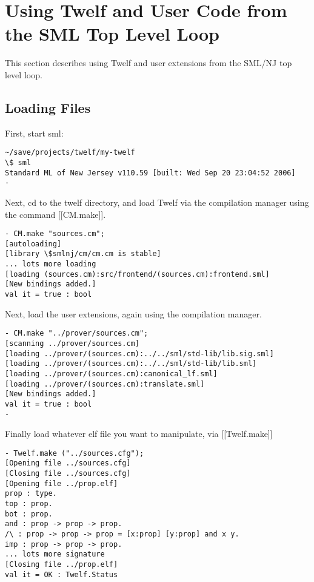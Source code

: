 \section{Using Twelf and User Code from the SML Top Level Loop}

This section describes using Twelf and user extensions from the SML/NJ top level
loop.


\subsection{Loading Files}
First, start sml:


\begin{verbatim} 
~/save/projects/twelf/my-twelf
\$ sml
Standard ML of New Jersey v110.59 [built: Wed Sep 20 23:04:52 2006]
- 
\end{verbatim} 

Next, cd to the twelf directory, and load Twelf via
the compilation manager using the command [[CM.make]].

\begin{verbatim} 
- CM.make "sources.cm"; 
[autoloading]
[library \$smlnj/cm/cm.cm is stable]
... lots more loading
[loading (sources.cm):src/frontend/(sources.cm):frontend.sml]
[New bindings added.]
val it = true : bool
\end{verbatim} 

Next, load the user extensions, again using
the compilation manager.

\begin{verbatim} 
- CM.make "../prover/sources.cm"; 
[scanning ../prover/sources.cm]
[loading ../prover/(sources.cm):../../sml/std-lib/lib.sig.sml]
[loading ../prover/(sources.cm):../../sml/std-lib/lib.sml]
[loading ../prover/(sources.cm):canonical_lf.sml]
[loading ../prover/(sources.cm):translate.sml]
[New bindings added.]
val it = true : bool
- 
\end{verbatim} 

Finally load whatever elf file you want to manipulate,
via [[Twelf.make]]

\begin{verbatim} 
- Twelf.make ("../sources.cfg");
[Opening file ../sources.cfg]
[Closing file ../sources.cfg]
[Opening file ../prop.elf]
prop : type.
top : prop.
bot : prop.
and : prop -> prop -> prop.
/\ : prop -> prop -> prop = [x:prop] [y:prop] and x y.
imp : prop -> prop -> prop.
... lots more signature
[Closing file ../prop.elf]
val it = OK : Twelf.Status
\end{verbatim} 

